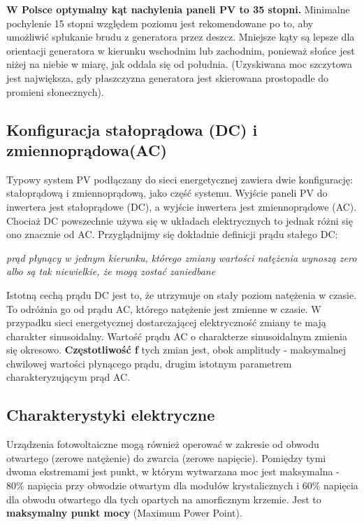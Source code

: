\documentclass[12pt,a4paper]{article}
\begin{document}
\textbf{W Polsce optymalny kąt nachylenia paneli PV to 35 stopni.} Minimalne 
pochylenie 15 stopni względem poziomu jest rekomendowane po to, aby 
umożliwić spłukanie brudu z generatora przez deszcz. Mniejsze kąty są 
lepsze dla orientacji generatora w kierunku wschodnim lub zachodnim, 
ponieważ słońce jest niżej na niebie w miarę, jak oddala się od 
południa. (Uzyskiwana moc szczytowa jest największa, gdy płaszczyzna 
generatora jest skierowana prostopadle do promieni słonecznych). 

\subsection{Konfiguracja stałoprądowa (DC) i zmiennoprądowa(AC)}

Typowy system PV podłączany do sieci energetycznej zawiera dwie 
konfigurację: stałoprądową i zmiennoprądową, jako część systemu. Wyjście 
paneli PV do inwertera jest stałoprądowe (DC), a wyjście inwertera jest 
zmiennoprądowe (AC). Chociaż DC powszechnie używa się w układach 
elektrycznych to jednak różni się ono znacznie od AC. Przyglądnijmy się 
dokładnie definicji prądu stałego DC: 
\begin{displayquote}
\textit{prąd płynący w jednym kierunku, którego zmiany wartości 
natężenia wynoszą zero albo są tak niewielkie, że mogą zostać 
zaniedbane}
\end{displayquote}

Istotną cechą prądu DC jest to, że utrzymuje on stały poziom natężenia w 
czasie. To odróżnia go od prądu AC, którego natężenie jest zmienne w 
czasie. W przypadku sieci energetycznej dostarczającej elektryczność 
zmiany te mają charakter sinusoidalny. Wartość prądu AC o charakterze 
sinusoidalnym zmienia się okresowo. \textbf{Częstotliwość f} tych 
zmian jest, obok amplitudy - maksymalnej chwilowej wartości płynącego 
prądu, drugim istotnym parametrem charakteryzującym prąd AC. 

\subsection{Charakterystyki elektryczne}


Urządzenia fotowoltaiczne mogą również operować w zakresie od obwodu 
otwartego (zerowe natężenie) do zwarcia (zerowe napięcie). Pomiędzy tymi 
dwoma ekstremami jest punkt, w którym wytwarzana moc jest maksymalna - 
80\% napięcia przy obwodzie otwartym dla modułów krystalicznych i 60\% 
napięcia dla obwodu otwartego dla tych opartych na amorficznym krzemie. 
Jest to \textbf{maksymalny punkt mocy} (Maximum Power Point). 
\end{document}
